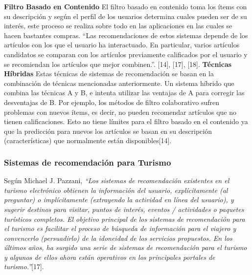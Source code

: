 \documentclass[12pt,letterpaper,openany]{book}
\begin{document}
\vspace{5mm}\newline
\textbf{Filtro Basado en Contenido}\newline
El filtro basado en contenido toma los ítems con su descripción y según el perfil de los usuarios determina cuales pueden ser de su interés, este proceso se realiza sobre todo en las aplicaciones en las cuales se hacen bastantes compras. “Las recomendaciones de estos sistemas depende de los artículos con los que el usuario ha interactuado. En particular, varios artículos candidatos se comparan con los artículos previamente calificados por el usuario y se recomiendan los artículos que mejor combinen.”. [14], [17], [18].
\vspace{5mm}\newline
\textbf{Técnicas Híbridas}\newline
Estas técnicas de sistemas de recomendación se basan en la combinación de técnicas mencionadas anteriormente. Un sistema híbrido que combina las técnicas A y B, e intenta utilizar las ventajas de A para corregir las desventajas de B. Por ejemplo, los métodos de filtro colaborativo sufren problemas con nuevos ítems, es decir, no pueden recomendar artículos que no tienen calificaciones. Esto no tiene límites para el filtro basado en el contenido ya que la predicción para nuevos los artículos se basan en su descripción (características) que normalmente están disponibles[14]. 

\subsubsection{Sistemas de recomendación para Turismo}
Según Michael J. Pazzani, \textit{“Los sistemas de recomendación existentes en el turismo electrónico obtienen la información del usuario, explícitamente (al preguntar) o implícitamente (extrayendo la actividad en línea del usuario), y sugerir destinos para visitar, puntos de interés, eventos / actividades o paquetes turísticos completos. El objetivo principal de los sistemas de recomendación para el turismo es facilitar el proceso de búsqueda de información para el viajero y convencerlo (persuadirlo) de la idoneidad de los servicios propuestos. En los últimos años, ha surgido una serie de sistemas de recomendación para el turismo y algunos de ellos ahora están operativos en los principales portales de turismo.”}[17]. 
\end{document}
